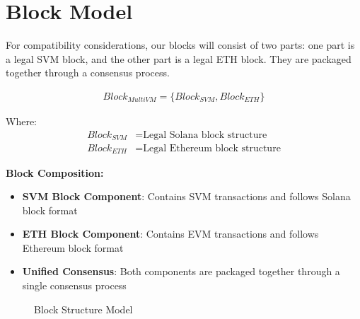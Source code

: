 \documentclass[11pt,a4paper]{article}
\begin{document}
\section{Block Model}

For compatibility considerations, our blocks will consist of two parts: one part is a legal SVM block, and the other part is a legal ETH block. They are packaged together through a consensus process.

\begin{align}
Block_{MultiVM} = \{Block_{SVM}, Block_{ETH}\}
\end{align}

Where:
\begin{align}
Block_{SVM} &= \text{Legal Solana block structure} \\
Block_{ETH} &= \text{Legal Ethereum block structure}
\end{align}

\textbf{Block Composition:}
\begin{itemize}
    \item \textbf{SVM Block Component}: Contains SVM transactions and follows Solana block format
    \item \textbf{ETH Block Component}: Contains EVM transactions and follows Ethereum block format
    \item \textbf{Unified Consensus}: Both components are packaged together through a single consensus process
\end{itemize}

\begin{figure}[h]
\centering
{}
\caption{Block Structure Model}
\label{fig:block-model}
\end{figure}
\end{document}
